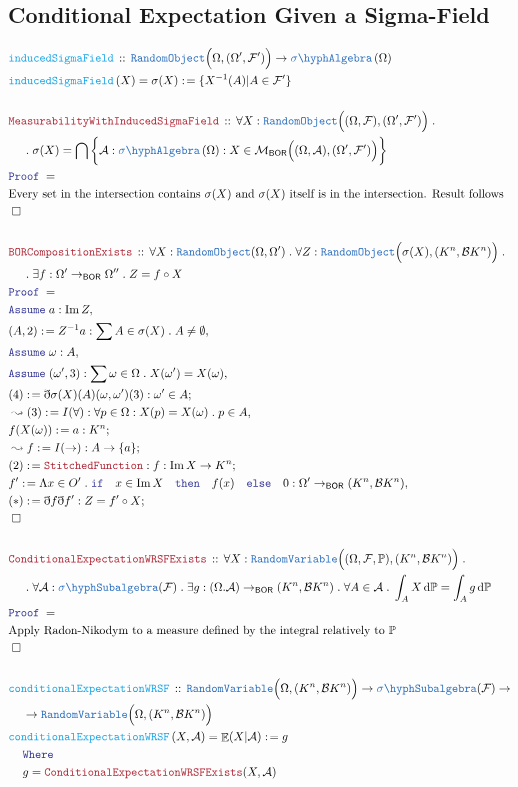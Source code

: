 \documentclass[12pt]{scrartcl}
\newcommand{\TYPE}[1]{\textcolor{NavyBlue}{\mathtt{#1}}}
\newcommand{\FUNC}[1]{\textcolor{Cerulean}{\mathtt{#1}}}
\newcommand{\LOGIC}[1]{\textcolor{Blue}{\mathtt{#1}}}
\newcommand{\THM}[1]{\textcolor{Maroon}{\mathtt{#1}}}
\renewcommand{\.}{\; . \;}
\newcommand{\de}{: \kern 0.1pc =}
\newcommand{\Act}[1]{\left( #1 \right)}
\newcommand{\Theorem}[2]{& \THM{#1} \, :: \, #2 \\ & \Proof = \\ }
\newcommand{\DeclareFunc}[2]{& \FUNC{#1} \, :: \, #2 \\}
\newcommand{\DefineNamedFunc}[4]{&  \FUNC{#1}\Act{#2} = #3 \de #4 \\}
\newcommand{\NewLine}{\\ & \kern 1pc}
\newcommand{\Page}[1]{\begin{align*} #1 \end{align*}   }
\newcommand{ \bd }{ \ByDef }
\DeclareMathOperator*{\im}{Im}
\newcommand{\Say}[3]{& #1 \de #2 : #3, \\}
\newcommand{\Conclude}[3]{& #1 \de #2 : #3; \\}
\newcommand{\Derive}[3]{& \leadsto #1 \de #2 : #3, \\}
\newcommand{\DeriveConclude}[3]{& \leadsto #1 \de #2 : #3 ; \\}
\newcommand{\A}{\LOGIC{Assume} \;}
\newcommand{\Assume}[2]{& \A #1 : #2, \\}
\newcommand{\QED}{\; \square}
\newcommand{\EndProof}{& \QED \\}
\newcommand{\ByDef}{\eth}
\newcommand{\Proof}{\LOGIC{Proof} \; }
\newcommand{\SA}[1]{\TYPE{\sigma \hyph  Algebra}\left( #1 \right) }  %
\newcommand{\BOR}{\mathsf{BOR}}
\newcommand{\F}{\mathcal{F}}
\renewcommand{\O}{\Omega}
\newcommand{\B}{\mathcal{B}}
\renewcommand{\P}{\mathbb{P}}
\newcommand{\RV}{\TYPE{RandomVariable}}
\newcommand{\RO}{\TYPE{RandomObject}}
\DeclareMathOperator*{\Exp}{\mathbb{E}}
\begin{document}
\subsection{Conditional Expectation Given a Sigma-Field}
\Page{
	\DeclareFunc{inducedSigmaField }{ \RO\Big( \O, (\O',\F') \Big) \to \SA{\O}} 
	\DefineNamedFunc{inducedSigmaField}{ X }{\sigma(X)}{ \{ X^{-1}(A) | A \in \F'   \}  }
	\\
	\Theorem{MeasurabilityWithInducedSigmaField}{
	\forall X : \RO\Big( (\O,\F), (\O',\F') \Big) \. 
	\NewLine \.
	\sigma(X)  = \bigcap\bigg\{ \mathcal{A} : \SA{\O} : X \in \mathcal{M}_\BOR\Big( (\O,\mathcal{A}),(\O',\F') \Big)    \bigg\}  
		}
	& \textrm{Every set in the intersection contains $\sigma(X)$ and $\sigma(X)$ itself is in the intersection. Result follows} \\
	\EndProof
	\\
	\Theorem{BORCompositionExists}{\forall X : \RO(\O,\O') \. \forall Z : \RO\Big(\sigma(X),(K^n,\B K^n) \Big) \. 
	\NewLine \.
	\exists f : \O' \to_\BOR \O'' \. Z = f \circ X }
	\Assume{a}{\im Z}
	\Say{(A,2)}{ Z^{-1}{a}}{ \sum A \in \sigma(X) \. A \neq \emptyset  }
	\Assume{\omega}{A}
	\Assume{(\omega',3)}{\sum \omega \in \O \. X(\omega') = X(\omega) }
	\Conclude{(4)}{\bd \sigma(X)(A)(\omega,\omega')(3)}{ \omega' \in A  }
	\Derive{(3)}{I(\forall)}{\forall p \in \O : X(p) = X(\omega) \. p \in A }
	\Conclude{f(X(\omega))}{a}{K^n}
	\DeriveConclude{f}{I(\to)}{A \to \{a\}}
	\Conclude{(2)}{\THM{StitchedFunction}}{f : \im X \to K^n }
	\Say{f'}{ \Lambda x \in O' \. \LOGIC{if} \quad x \in \im X \quad \LOGIC{then} \quad f(x) \quad \LOGIC{else} \quad 0}{\O' \to_\BOR (K^n,\B K^n)}
	\Conclude{(*)}{\bd f \bd f'}{Z = f' \circ X}
	\EndProof
	\\
	\Theorem{ConditionalExpectationWRSFExists}{\forall X  : \RV\Big( (\O,\F,\P), (K^n,\B K^n)  \Big) \. \NewLine \.
		\forall \mathcal{A} : \TYPE{\sigma \hyph Subalgebra}(\F) \. \exists g : (\O.\mathcal{A}) \to_\BOR  (K^n,\B K^n) \.
		\forall A \in \mathcal{A} \. \int_A X \, \mathrm{d}\P = \int_A g \, \mathrm{d}\P
	}
	& \textrm{Apply Radon-Nikodym to a measure defined by the integral relatively to $\P$} \\
	\EndProof
	\\
	\DeclareFunc{conditionalExpectationWRSF}{ \RV\Big( \O, (K^n,\B K^n) \Big)  \to \TYPE{\sigma \hyph Subalgebra}(\F) \to 
		\NewLine \to
		\RV\Big(\O, (K^n,\B K^n)\Big)  }
	\DefineNamedFunc{conditionalExpectationWRSF}{ X, \mathcal{A}  }{ \Exp(X|\mathcal{A})  }{g \NewLine \LOGIC{Where} \NewLine g = \THM{ConditionalExpectationWRSFExists}(X,\mathcal{A})  }
}
\end{document}
